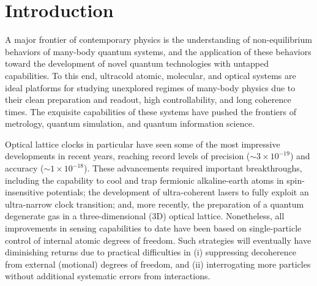 \documentclass[aps,prx,superscriptaddress,twocolumn]{revtex4-2}
\begin{document}
\section{Introduction}

A major frontier of contemporary physics is the understanding of non-equilibrium behaviors of many-body quantum systems, and the application of these behaviors toward the development of novel quantum technologies with untapped capabilities\cite{eisert2015quantum}.
To this end, ultracold atomic, molecular, and optical systems are ideal platforms for studying unexplored regimes of many-body physics due to their clean preparation and readout, high controllability, and long coherence times\cite{bloch2008manybody, gross2017quantum}.
The exquisite capabilities of these systems have pushed the frontiers of metrology, quantum simulation, and quantum information science.

Optical lattice clocks in particular have seen some of the most impressive developments in recent years, reaching record levels of precision ($\sim 3\times 10^{-19}$)\cite{campbell2017fermidegenerate, marti2018imaging} and accuracy ($\sim 1\times 10^{-18}$)\cite{bloom2014optical, mcgrew2018atomic}.
These advancements required important breakthroughs, including the capability to cool and trap fermionic alkaline-earth atoms in spin-insensitive potentials\cite{takamoto2003spectroscopy, barber2006direct, ye2008quantum}; the development of ultra-coherent lasers\cite{kessler2012sub40mhzlinewidth, cole2013tenfold, matei2017mu} to fully exploit an ultra-narrow clock transition\cite{ludlow2015optical}; and, more recently, the preparation of a quantum degenerate gas in a three-dimensional (3D) optical lattice\cite{campbell2017fermidegenerate, marti2018imaging, goban2018emergence}.
Nonetheless, all improvements in sensing capabilities to date have been based on single-particle control of internal atomic degrees of freedom.
Such strategies will eventually have diminishing returns due to practical difficulties in (i) suppressing decoherence from external (motional) degrees of freedom, and (ii) interrogating more particles without additional systematic errors from interactions\cite{martin2013quantum, ludlow2015optical, marti2018imaging}.
\end{document}
